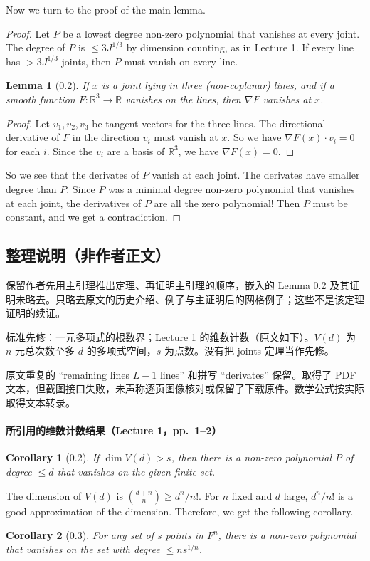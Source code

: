 \documentclass[UTF8,11pt]{ctexart}
\newtheorem*{lemma}{Lemma}
\newtheorem*{corollary}{Corollary}
\begin{document}
Now we turn to the proof of the main lemma.
\begin{proof}
Let $P$ be a lowest degree non-zero polynomial that vanishes at every joint. The degree of $P$ is $\leq 3J^{1/3}$ by dimension counting, as in Lecture 1. If every line has $>3J^{1/3}$ joints, then $P$ must vanish on every line.

\begin{lemma}[0.2]
If $x$ is a joint lying in three (non-coplanar) lines, and if a smooth function $F:\mathbb R^3\to\mathbb R$ vanishes on the lines, then $\nabla F$ vanishes at $x$.
\end{lemma}
\begin{proof}
Let $v_1,v_2,v_3$ be tangent vectors for the three lines. The directional derivative of $F$ in the direction $v_i$ must vanish at $x$. So we have $\nabla F(x)\cdot v_i=0$ for each $i$. Since the $v_i$ are a basis of $\mathbb R^3$, we have $\nabla F(x)=0$.
\end{proof}
So we see that the derivates of $P$ vanish at each joint. The derivates have smaller degree than $P$. Since $P$ was a minimal degree non-zero polynomial that vanishes at each joint, the derivatives of $P$ are all the zero polynomial! Then $P$ must be constant, and we get a contradiction.
\end{proof}


\subsection*{整理说明（非作者正文）}
保留作者先用主引理推出定理、再证明主引理的顺序，嵌入的 Lemma 0.2 及其证明未略去。只略去原文的历史介绍、例子与主证明后的网格例子；这些不是该定理证明的续证。

标准先修：一元多项式的根数界；Lecture 1 的维数计数（原文如下）。$V(d)$ 为 $n$ 元总次数至多 $d$ 的多项式空间，$s$ 为点数。没有把 joints 定理当作先修。

原文重复的 ``remaining lines $L-1$ lines'' 和拼写 ``derivates'' 保留。取得了 PDF 文本，但截图接口失败，未声称逐页图像核对或保留了下载原件。数学公式按实际取得文本转录。

\paragraph{所引用的维数计数结果（Lecture 1，pp.~1--2）}
\begin{corollary}[0.2]
If $\dim V(d)>s$, then there is a non-zero polynomial $P$ of degree $\leq d$ that vanishes on the given finite set.
\end{corollary}
The dimension of $V(d)$ is $\binom{d+n}{n}\geq d^n/n!$. For $n$ fixed and $d$ large, $d^n/n!$ is a good approximation of the dimension. Therefore, we get the following corollary.
\begin{corollary}[0.3]
For any set of $s$ points in $F^n$, there is a non-zero polynomial that vanishes on the set with degree $\leq ns^{1/n}$.
\end{corollary}
\end{document}
